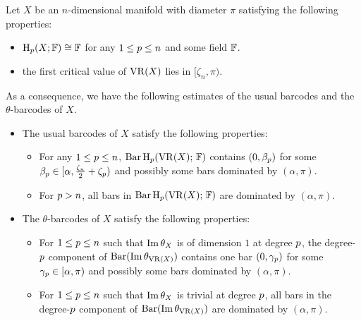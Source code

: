 Let $X$ be an $n$-dimensional manifold with diameter $\pi$ satisfying the following properties:
\begin{itemize}
    \item $\mathrm{H}_\degp (X; \field)\cong \field$ for any $1\leq \degp\leq n$ and some field $\field$.
    \item the first critical value of $\VR(X)$ lies in $[\zeta_n, \pi)$.
\end{itemize}
As a consequence, we have the following estimates of the usual barcodes and the $\theta$-barcodes of $X$.
\begin{itemize}
    \item The usual barcodes of $X$ satisfy the following properties:
        \begin{itemize}
            \item For any $1 \leq \degp \leq n$, $\Hbarc[\field]{\degp}{X}$ contains $(0,\beta_\degp )$ for some $\beta_\degp \in [\alpha, \tfrac{\zeta_n}{2}+\zeta_\degp )$ and possibly some bars dominated by $(\alpha, \pi)$.
            \item For $\degp > n$, all bars in $\Hbarc[\field]{\degp}{X}$ are dominated by $(\alpha, \pi)$.
        \end{itemize}
    \item The $\theta$-barcodes of $X$ satisfy the following properties: 
        \begin{itemize}
            \item For $1 \leq \degp \leq n$ such that $\img \theta_X$ is of dimension $1$ at degree $\degp$, the degree-$\degp$ component of $\thetabarc{X}$ contains one bar $(0,\gamma_\degp )$ for some $\gamma_\degp \in [\alpha, \pi)$ and possibly some bars dominated by $(\alpha, \pi)$. 
            \item For $1 \leq \degp \leq n$ such that $\img \theta_X$ is trivial at degree $\degp$, all bars in the degree-$\degp$ component of $\thetabarc{X}$ are dominated by $(\alpha, \pi)$. 
        \end{itemize}
\end{itemize}

\example {}


